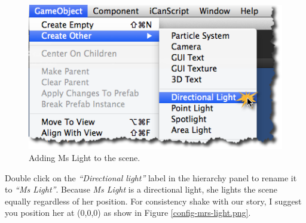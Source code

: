 \begin{figure}[htbp]
\centering
\includegraphics[keepaspectratio,width=\textwidth,height=0.75\textheight]{adding-directional-light.png}
\caption{Adding Ms Light to the scene.}
\label{adding-directional-light.png}
\end{figure}

Double click on the \emph{``Directional light''} label in the hierarchy panel to rename it to \emph{``Ms Light''}. Because \emph{Ms Light} is a directional light, she lights the scene equally regardless of her position. For consistency shake with our story, I suggest you position her at (0,0,0) as show in Figure \ref{config-mrs-light.png}.

